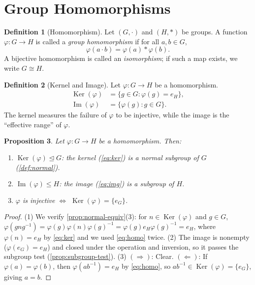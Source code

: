 \documentclass[12pt,a4paper]{article}
\theoremstyle{definition}
\newtheorem{definition}{Definition}[section]
\theoremstyle{plain}
\newtheorem{proposition}[definition]{Proposition}
\theoremstyle{remark}
\newcommand{\Ker}{\operatorname{Ker}}
\newcommand{\Img}{\operatorname{Im}}
\newcommand{\normal}{\trianglelefteq}
\begin{document}
\section{Group Homomorphisms}\label{sec:homomorphisms}

\begin{definition}[Homomorphism]\label{def:homo}
Let $(G, \cdot)$ and $(H, *)$ be groups.
A function $\varphi \colon G \to H$ is called a \emph{group homomorphism} if
for all $a, b \in G$,
\begin{equation}\label{eq:homo}
    \varphi(a \cdot b) = \varphi(a) * \varphi(b).
\end{equation}
A bijective homomorphism is called an \emph{isomorphism}; if such a map exists,
we write $G \cong H$.
\end{definition}

\begin{definition}[Kernel and Image]\label{def:kernel-image}
Let $\varphi \colon G \to H$ be a homomorphism.
\begin{align}
    \Ker(\varphi) &= \{g \in G : \varphi(g) = e_H\}, \label{eq:ker}\\
    \Img(\varphi) &= \{\varphi(g) : g \in G\}. \label{eq:img}
\end{align}
The kernel measures the failure of $\varphi$ to be injective,
while the image is the ``effective range'' of $\varphi$.
\end{definition}

\begin{proposition}\label{prop:ker-normal}
Let $\varphi \colon G \to H$ be a homomorphism. Then:
\begin{enumerate}
    \item $\Ker(\varphi) \normal G$: the kernel (\cref{eq:ker}) is a normal subgroup
          of $G$ (\cref{def:normal}).
    \item $\Img(\varphi) \leq H$: the image (\cref{eq:img}) is a subgroup
          of $H$.
    \item $\varphi$ is injective $\iff$ $\Ker(\varphi) = \{e_G\}$.
\end{enumerate}
\end{proposition}

\begin{proof}
(1) We verify \cref{prop:normal-equiv}(3): for $n \in \Ker(\varphi)$ and $g \in G$,
$\varphi(gng^{-1}) = \varphi(g)\varphi(n)\varphi(g)^{-1} = \varphi(g) e_H \varphi(g)^{-1} = e_H$,
where $\varphi(n) = e_H$ by \cref{eq:ker} and we used \cref{eq:homo} twice.
(2) The image is nonempty ($\varphi(e_G) = e_H$) and closed under the operation
and inversion, so it passes the subgroup test (\cref{prop:subgroup-test}).
(3) $(\Rightarrow)$: Clear. $(\Leftarrow)$: If $\varphi(a) = \varphi(b)$,
then $\varphi(ab^{-1}) = e_H$ by \cref{eq:homo}, so $ab^{-1} \in \Ker(\varphi) = \{e_G\}$,
giving $a = b$.
\end{proof}
\end{document}
